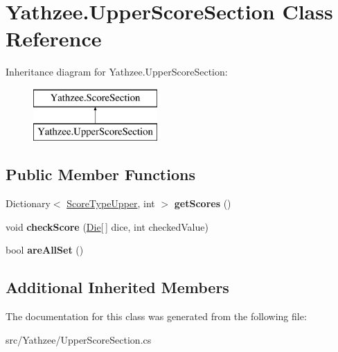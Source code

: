 \hypertarget{class_yathzee_1_1_upper_score_section}{}\section{Yathzee.\+Upper\+Score\+Section Class Reference}
\label{class_yathzee_1_1_upper_score_section}
Inheritance diagram for Yathzee.\+Upper\+Score\+Section\+:\begin{figure}[H]
\begin{center}
\leavevmode
\includegraphics[height=2.000000cm]{class_yathzee_1_1_upper_score_section}
\end{center}
\end{figure}
\subsection*{Public Member Functions}
\begin{DoxyCompactItemize}
\item 
Dictionary$<$ \hyperlink{namespace_yathzee_af9eae2784d7776b80bb77da141a63b7f}{Score\+Type\+Upper}, int $>$ {\bfseries get\+Scores} ()\hypertarget{class_yathzee_1_1_upper_score_section_aa10b4b6d4c7038e80c9d221bfb482b72}{}\label{class_yathzee_1_1_upper_score_section_aa10b4b6d4c7038e80c9d221bfb482b72}

\item 
void {\bfseries check\+Score} (\hyperlink{class_yathzee_1_1_die}{Die}\mbox{[}$\,$\mbox{]} dice, int checked\+Value)\hypertarget{class_yathzee_1_1_upper_score_section_ae2db6ea707243900dc1b87cdc4ff9e2f}{}\label{class_yathzee_1_1_upper_score_section_ae2db6ea707243900dc1b87cdc4ff9e2f}

\item 
bool {\bfseries are\+All\+Set} ()\hypertarget{class_yathzee_1_1_upper_score_section_ab539f23446aface95d748a3ebc5396d2}{}\label{class_yathzee_1_1_upper_score_section_ab539f23446aface95d748a3ebc5396d2}

\end{DoxyCompactItemize}
\subsection*{Additional Inherited Members}


The documentation for this class was generated from the following file\+:\begin{DoxyCompactItemize}
\item 
src/\+Yathzee/Upper\+Score\+Section.\+cs\end{DoxyCompactItemize}
